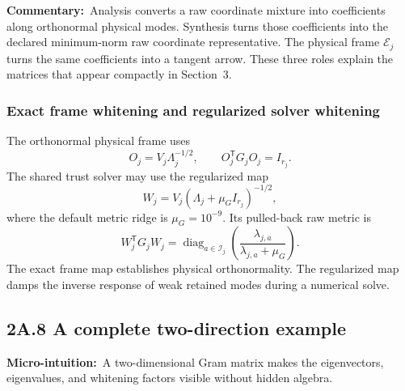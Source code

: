 \documentclass[10pt,twocolumn]{article}
\newcommand{\micro}[1]{\par\noindent\textbf{Micro-intuition:}\ #1\par}
\newcommand{\commentary}[1]{\par\noindent\textbf{Commentary:}\ #1\par}
\newcommand{\conceptbreak}{\par\medskip\noindent{\color{black!30}\rule{\columnwidth}{0.35pt}}\par\medskip}
\begin{document}
\commentary{Analysis converts a raw coordinate mixture into coefficients along
orthonormal physical modes. Synthesis turns those coefficients into the
declared minimum-norm raw coordinate representative. The physical frame
\(\mathcal E_j\) turns the same coefficients into a tangent arrow. These three
roles explain the matrices that appear compactly in Section~3.}

\subsubsection*{Exact frame whitening and regularized solver whitening}

The orthonormal physical frame uses
\begin{equation}
O_j=V_j\Lambda_j^{-1/2},
\qquad
O_j^{\mathsf T}G_jO_j=I_{r_j}.
\label{eq:bridge-raw-orthonormalizer}
\end{equation}
The shared trust solver may use the regularized map
\begin{equation}
W_j=V_j(\Lambda_j+\mu_GI_{r_j})^{-1/2},
\label{eq:bridge-regularized-whitener}
\end{equation}
where the default metric ridge is \(\mu_G=10^{-9}\). Its pulled-back raw metric
is
\begin{equation}
W_j^{\mathsf T}G_jW_j
=\operatorname{diag}_{a\in\mathcal I_j}
\left(\frac{\lambda_{j,a}}{\lambda_{j,a}+\mu_G}\right).
\label{eq:bridge-regularized-pulled-metric}
\end{equation}
The exact frame map establishes physical orthonormality. The regularized map
damps the inverse response of weak retained modes during a numerical solve.

\conceptbreak

\subsection*{2A.8 A complete two-direction example}

\micro{A two-dimensional Gram matrix makes the eigenvectors, eigenvalues, and
whitening factors visible without hidden algebra.}
\end{document}
